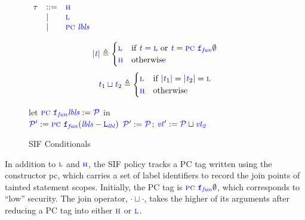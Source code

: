 \documentclass{llncs}
\begin{document}
\begin{figure}[t]
  \begin{minipage}{0.17\textwidth}
    \color{blue}
    \(\begin{array}{lll}
      \tau & ::= & \high \\
      & | & \low \\
      & | & \pctaint{\LNS} \\
    \end{array}\)
  \end{minipage}
  \begin{minipage}{0.5\textwidth}
    \[|\gentag| \triangleq
    \begin{cases}
      \low & \textnormal{if } \gentag = \low \textnormal{ or } \gentag = \pctaint{\FN}{\emptyset} \\
      \high & \textnormal{otherwise} \\
    \end{cases}\]
    \[\gentag_1 \sqcup \gentag_2 \triangleq
    \begin{cases}
      \low & \textnormal{if } |\gentag_1| = |\gentag_2| = \low \\
      \high & \textnormal{otherwise} \\
    \end{cases}\]
  \end{minipage}
  \scriptsize
  \begin{minipage}{0.25\textwidth}
        {let \(\pctaint{\FN}{\LNS} := \PCT\) in \\
          \(\PCT['] := \pctaint{\FN}{(\LNS-\LN)}\)
        }
    \assigntruleblock
        {\(\PCT[']:=\PCT\); \(\vt':=\PCT \sqcup \vt[_2]\)}
  \end{minipage}
  
  \caption{SIF Conditionals}
  \label{fig:SIFconditionals}
\end{figure}

In addition to \(\low\) and \(\high\), the SIF policy tracks a PC tag written using the
constructor {\sc \color{blue} pc}, which carries a
set of label identifiers to record the join points of tainted statement scopes.
Initially, the PC tag is \(\pctaint{\FN[f]}{\emptyset}\), which corresponds
to ``low'' security. The join operator, \(\cdot \sqcup \cdot\), takes the higher of its
arguments after reducing a PC tag into either \(\high\) or \(\low\).
\end{document}
